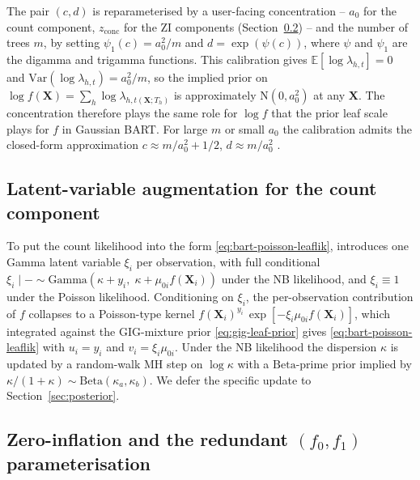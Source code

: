 \documentclass[11pt]{article}
\theoremstyle{plain}
\theoremstyle{definition}
\theoremstyle{remark}
\newcommand{\Be}{\mathrm{Beta}}
\newcommand{\Ga}{\mathrm{Gamma}}
\newcommand{\N}{\mathrm{N}}
\newcommand{\X}{\mathbf{X}}
\newcommand{\E}{\mathbb{E}}
\newcommand{\Var}{\mathrm{Var}}
\newcommand{\azero}{a_{0}}
\newcommand{\leafc}{c}
\newcommand{\leafd}{d}
\newcommand{\fzeroSym}{f_{0}}
\newcommand{\foneSym}{f_{1}}
\newcommand{\zconc}{z_{\mathrm{conc}}}
\newcommand{\xilat}{\xi_{i}}
\begin{document}
The pair $(\leafc, \leafd)$ is reparameterised by a user-facing
concentration -- $\azero$ for the count component, $\zconc$ for the
ZI components (Section~\ref{sec:zi-param}) -- and the number of trees
$m$, by setting $\psi_1(\leafc) = \azero^2 / m$ and
$\leafd = \exp(\psi(\leafc))$, where $\psi$ and $\psi_1$ are the
digamma and trigamma functions. This calibration gives
$\E[\log \lambda_{h,t}] = 0$ and
$\Var(\log \lambda_{h,t}) = \azero^2 / m$, so the implied prior on
$\log f(\X) = \sum_h \log \lambda_{h, t(\X; T_h)}$ is approximately
$\N(0, \azero^2)$ at any $\X$. The concentration therefore plays the
same role for $\log f$ that the prior leaf scale plays for $f$ in
Gaussian BART. For large $m$ or small $\azero$ the calibration admits
the closed-form approximation $\leafc \approx m / \azero^2 + 1/2$,
$\leafd \approx m / \azero^2$ \citep[Proposition
3]{murray2021loglinear}.

\subsection{Latent-variable augmentation for the count
component}\label{sec:loglinear-augmentation}

To put the count likelihood into the form
\eqref{eq:bart-poisson-leaflik}, \citet{murray2021loglinear}
introduces one Gamma latent variable $\xilat$ per observation, with
full conditional
$\xilat \mid - \sim \Ga(\kappa + y_i,\; \kappa + \mu_{0i} f(\X_i))$
under the NB likelihood, and $\xilat \equiv 1$ under the Poisson
likelihood. Conditioning on $\xilat$, the per-observation
contribution of $f$ collapses to a Poisson-type kernel
$f(\X_i)^{y_i}\, \exp[-\xilat \mu_{0i} f(\X_i)]$, which integrated
against the GIG-mixture prior \eqref{eq:gig-leaf-prior} gives
\eqref{eq:bart-poisson-leaflik} with $u_i = y_i$ and
$v_i = \xilat \mu_{0i}$. Under the NB likelihood the dispersion
$\kappa$ is updated by a random-walk MH step on $\log \kappa$ with a
$\Be$-prime prior implied by
$\kappa / (1 + \kappa) \sim \Be(\kappa_a, \kappa_b)$. We defer the
specific update to Section~\ref{sec:posterior}.

\subsection{Zero-inflation and the redundant
$(\fzeroSym, \foneSym)$ parameterisation}\label{sec:zi-param}
\end{document}
